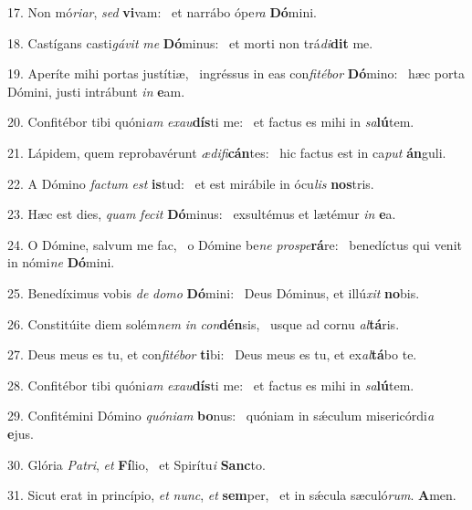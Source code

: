 17. Non mó\textit{ri}\textit{ar}, \textit{sed} \textbf{vi}vam: \ast\  et narrábo ópe\textit{ra} \textbf{Dó}mini.\

18. Castígans casti\textit{gá}\textit{vit} \textit{me} \textbf{Dó}minus: \ast\  et morti non trá\textit{di}\textbf{dit} me.\

19. Aperíte mihi portas justítiæ, \dag\  ingréssus in eas con\textit{fi}\textit{té}\textit{bor} \textbf{Dó}mino: \ast\  hæc porta Dómini, justi intrábunt \textit{in} \textbf{e}am.\

20. Confitébor tibi quóni\textit{am} \textit{ex}\textit{au}\textbf{dís}ti me: \ast\  et factus es mihi in \textit{sa}\textbf{lú}tem.\

21. Lápidem, quem reprobavérunt \textit{æ}\textit{di}\textit{fi}\textbf{cán}tes: \ast\  hic factus est in ca\textit{put} \textbf{án}guli.\

22. A Dómino \textit{fac}\textit{tum} \textit{est} \textbf{is}tud: \ast\  et est mirábile in ócu\textit{lis} \textbf{nos}tris.\

23. Hæc est dies, \textit{quam} \textit{fe}\textit{cit} \textbf{Dó}minus: \ast\  exsultémus et lætémur \textit{in} \textbf{e}a.\

24. O Dómine, salvum me fac, \dag\  o Dómine be\textit{ne} \textit{pro}\textit{spe}\textbf{rá}re: \ast\  benedíctus qui venit in nómi\textit{ne} \textbf{Dó}mini.\

25. Benedíximus vobis \textit{de} \textit{do}\textit{mo} \textbf{Dó}mini: \ast\  Deus Dóminus, et illú\textit{xit} \textbf{no}bis.\

26. Constitúite diem solém\textit{nem} \textit{in} \textit{con}\textbf{dén}sis, \ast\  usque ad cornu \textit{al}\textbf{tá}ris.\

27. Deus meus es tu, et con\textit{fi}\textit{té}\textit{bor} \textbf{ti}bi: \ast\  Deus meus es tu, et ex\textit{al}\textbf{tá}bo te.\

28. Confitébor tibi quóni\textit{am} \textit{ex}\textit{au}\textbf{dís}ti me: \ast\  et factus es mihi in \textit{sa}\textbf{lú}tem.\

29. Confitémini Dómino \textit{quón}\textit{i}\textit{am} \textbf{bo}nus: \ast\  quóniam in sǽculum misericórdi\textit{a} \textbf{e}jus.\

30. Glória \textit{Pa}\textit{tri}, \textit{et} \textbf{Fí}lio, \ast\  et Spirítu\textit{i} \textbf{Sanc}to.\

31. Sicut erat in princípio, \textit{et} \textit{nunc}, \textit{et} \textbf{sem}per, \ast\  et in sǽcula sæculó\textit{rum}. \textbf{A}men.\

